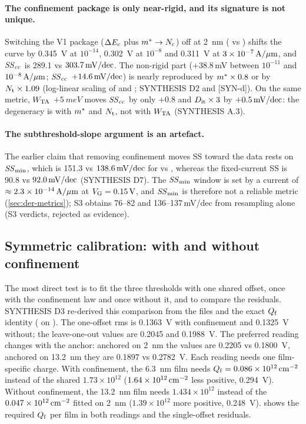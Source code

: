 \paragraph{The confinement package is only near-rigid, and its signature is not unique.} Switching the V1 package ($\Delta E_{\mathrm{c}}$ plus $m^{*}\rightarrow N_{\mathrm{c}}$) off at \SI{2}{nm} ( vs ) shifts the curve by \SI{0.345}{V} at $10^{-14}$, \SI{0.302}{V} at $10^{-8}$ and \SI{0.311}{V} at $3\times10^{-7}\,\mathrm{A}/\mu\mathrm{m}$, and $\mathit{SS}_{\mathrm{cc}}$ is 289.1 vs $303.7\,\mathrm{mV/dec}$. The non-rigid part ($+38.8$\,mV between $10^{-11}$ and $10^{-8}\,\mathrm{A}/\mu\mathrm{m}$; $\mathit{SS}_{\mathrm{cc}}$ $+14.6\,\mathrm{mV/dec}$) is nearly reproduced by $m^{*} \times 0.8$ or by $N_{\mathrm{t}} \times 1.09$ (log-linear scaling of  and ; SYNTHESIS D2 and [SYN-d]). On the same metric, $W_{\mathrm{TA}}$ $+\SI{5}{meV}$ moves $\mathit{SS}_{\mathrm{cc}}$ by only $+0.8$ and $D_{\mathrm{it}}\times3$ by $+0.5\,\mathrm{mV/dec}$: the degeneracy is with $m^{*}$ and $N_{\mathrm{t}}$, not with $W_{\mathrm{TA}}$ (SYNTHESIS A.3).

\paragraph{The subthreshold-slope argument is an artefact.} The earlier claim that removing confinement moves SS toward the data rests on $\mathit{SS}_{\min}$, which is 151.3 vs $138.6\,\mathrm{mV/dec}$ for  vs , whereas the fixed-current SS is 90.8 vs $92.0\,\mathrm{mV/dec}$ (SYNTHESIS D7). The $\mathit{SS}_{\min}$ window is set by a current of $\approx 2.3\times10^{-14}\,\mathrm{A}/\mu\mathrm{m}$ at $V_{\mathrm{G}} = \SI{0.15}{V}$, and $\mathit{SS}_{\min}$ is therefore not a reliable metric (\cref{sec:der-metrics}); S3 obtains 76--82 and 136--137\,mV/dec from resampling alone (S3 verdicts, rejected as evidence).

\subsection{Symmetric calibration: with and without confinement}
The most direct test is to fit the three thresholds with one shared offset, once with the confinement law and once without it, and to compare the residuals. SYNTHESIS D3 re-derived this comparison from the  files and the exact $Q_{\mathrm{f}}$ identity (\evNUM{} on \evDATA). The one-offset rms is \SI{0.1363}{V} with confinement and \SI{0.1325}{V} without; the leave-one-out values are 0.2045 and \SI{0.1988}{V}. The preferred reading changes with the anchor: anchored on \SI{2}{nm} the values are 0.2205 vs \SI{0.1800}{V}, anchored on \SI{13.2}{nm} they are 0.1897 vs \SI{0.2782}{V}. Each reading needs one film-specific charge. With confinement, the \SI{6.3}{nm} film needs $Q_{\mathrm{f}} = 0.086\times10^{12}\,\mathrm{cm}^{-2}$ instead of the shared $1.73\times10^{12}$ ($1.64\times10^{12}\,\mathrm{cm}^{-2}$ less positive, \SI{0.294}{V}). Without confinement, the \SI{13.2}{nm} film needs $1.434\times10^{12}$ instead of the $0.047\times10^{12}\,\mathrm{cm}^{-2}$ fitted on \SI{2}{nm} ($1.39\times10^{12}$ more positive, \SI{0.248}{V}).  shows the required $Q_{\mathrm{f}}$ per film in both readings and the single-offset residuals.

